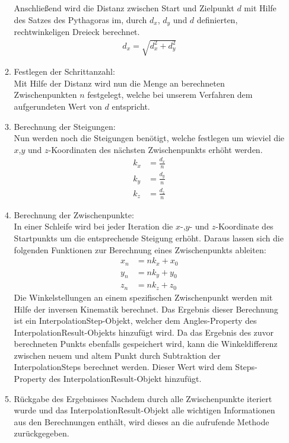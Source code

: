 \begin{itemize}
\begin{enumerate}
Anschließend wird die Distanz zwischen Start und Zielpunkt $d$ mit Hilfe des Satzes des Pythagoras im, durch $d_x$, $d_y$ und $d$ definierten, rechtwinkeligen Dreieck berechnet.
\begin{align*}
d_x = \sqrt{d_x^2+d_y^2}
\end{align*}
\item Festlegen der Schrittanzahl:\\
Mit Hilfe der Distanz wird nun die Menge an berechneten Zwischenpunkten $n$ festgelegt, welche bei unserem Verfahren dem aufgerundeten Wert von $d$ entspricht.
\item Berechnung der Steigungen:\\
Nun werden noch die Steigungen benötigt, welche festlegen um wieviel die $x$,$y$ und $z$-Koordinaten des nächsten Zwischenpunkts erhöht werden.
\begin{align*}
k_x & = \frac{d_x}{n}\\
k_y & = \frac{d_y}{n}\\
k_z & = \frac{d_z}{n}
\end{align*}
\item Berechnung der Zwischenpunkte:\\
In einer Schleife wird bei jeder Iteration die $x$-,$y$- und $z$-Koordinate des Startpunkts um die entsprechende Steigung erhöht. Daraus lassen sich die folgenden Funktionen zur Berechnung eines Zwischenpunkts ableiten:
\begin{align*}
x_n & = n k_x + x_0\\
y_n & =  n k_y + y_0\\
z_n & = n k_z + z_0 
\end{align*}
Die Winkelstellungen an einem spezifischen Zwischenpunkt werden mit Hilfe der inversen Kinematik berechnet. Das Ergebnis dieser Berechnung ist ein InterpolationStep-Objekt, welcher dem Angles-Property des InterpolationResult-Objekts hinzufügt wird. Da das Ergebnis des zuvor berechneten Punkts ebenfalls gespeichert wird, kann die Winkeldifferenz zwischen neuem und altem Punkt durch Subtraktion der InterpolationSteps berechnet werden. Dieser Wert wird dem Steps-Property des InterpolationResult-Objekt hinzufügt.
\item Rückgabe des Ergebnisses
Nachdem durch alle Zwischenpunkte iteriert wurde und das InterpolationResult-Objekt alle wichtigen Informationen aus den Berechnungen enthält, wird dieses an die aufrufende Methode zurückgegeben.
\end{enumerate}
\end{itemize}